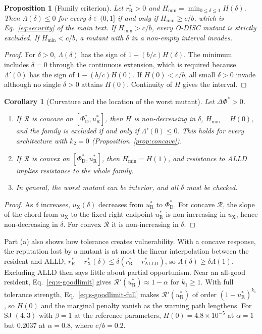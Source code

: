 \documentclass[fleqn,10pt]{wlscirep}
\newcommand{\Rmap}{\mathscr{R}}            %
\newcommand{\rR}{r_{\mathrm{R}}^{*}}
\newcommand{\uR}{u_{\mathrm{R}}^{*}}
\newcommand{\rX}{r_{\mathrm{X}}^{*}}
\newcommand{\uX}{u_{\mathrm{X}}}
\newcommand{\dPhi}{\Delta\Phi^{*}}
\newcommand{\Hmin}{H_{\min}}
\newcommand{\ALLD}{\mathrm{ALLD}}
\theoremstyle{plain}
\newtheorem{proposition}[lemma]{Proposition}
\newtheorem{corollary}[lemma]{Corollary}
\begin{document}
\begin{proposition}[Family criterion]\label{prop:family}
Let $\rR>0$ and $\Hmin=\min_{0\leq\delta\leq1}H(\delta)$. Then $\Lambda(\delta)\leq0$ for every $\delta\in(0,1]$ if and only if $\Hmin\geq c/b$, which is Eq.~\eqref{eq:security} of the main text. If $\Hmin>c/b$, every O-DISC mutant is strictly excluded. If $\Hmin<c/b$, a mutant with $\delta$ in a non-empty interval invades.
\end{proposition}
\begin{proof}
For $\delta>0$, $\Lambda(\delta)$ has the sign of $1-(b/c)H(\delta)$. The minimum includes $\delta=0$ through the continuous extension, which is required because $\Lambda'(0)$ has the sign of $1-(b/c)H(0)$. If $H(0)<c/b$, all small $\delta>0$ invade although no single $\delta>0$ attains $H(0)$. Continuity of $H$ gives the interval.
\end{proof}

\begin{corollary}[Curvature and the location of the worst mutant]\label{cor:curvature}
Let $\dPhi>0$.
\begin{enumerate}
\item[(a)] If $\Rmap$ is concave on $[\Phi^*_{\mathrm D},\uR]$, then $H$ is non-decreasing in $\delta$, $\Hmin=H(0)$, and the family is excluded if and only if $\Lambda'(0)\leq0$. This holds for every architecture with $k_2=0$ (Proposition~\ref{prop:concave}).
\item[(b)] If $\Rmap$ is convex on $[\Phi^*_{\mathrm D},\uR]$, then $\Hmin=H(1)$, and resistance to ALLD implies resistance to the whole family.
\item[(c)] In general, the worst mutant can be interior, and all $\delta$ must be checked.
\end{enumerate}
\end{corollary}
\begin{proof}
As $\delta$ increases, $\uX(\delta)$ decreases from $\uR$ to $\Phi^*_{\mathrm D}$. For concave $\Rmap$, the slope of the chord from $\uX$ to the fixed right endpoint $\uR$ is non-increasing in $\uX$, hence non-decreasing in $\delta$. For convex $\Rmap$ it is non-increasing in $\delta$.
\end{proof}

Part (a) also shows how tolerance creates vulnerability. With a concave response, the reputation lost by a mutant is at most the linear interpolation between the resident and ALLD, $\rR-\rX(\delta)\leq\delta(\rR-r^*_{\ALLD})$, so $\Lambda(\delta)\geq\delta\Lambda(1)$. Excluding ALLD then says little about partial opportunism. Near an all-good resident, Eq.~\eqref{eq:s-goodlimit} gives $\Rmap'(\uR)\approx1-\alpha$ for $k_1\geq1$. With full tolerance strength, Eq.~\eqref{eq:s-goodlimit-full} makes $\Rmap'(\uR)$ of order $(1-\uR)^{k_1}$, so $H(0)$ and the marginal penalty vanish as the warning path lengthens. For SJ $(4,3)$ with $\beta=1$ at the reference parameters, $H(0)=4.8\times10^{-5}$ at $\alpha=1$ but $0.2037$ at $\alpha=0.8$, where $c/b=0.2$.
\end{document}
